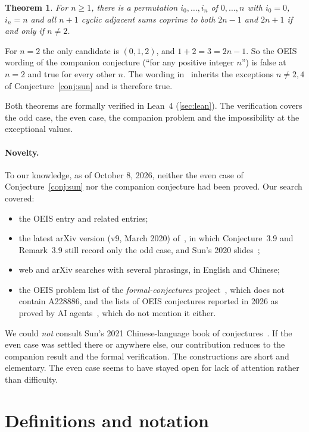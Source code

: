 \documentclass[11pt]{article}
\numberwithin{equation}{section}
\newtheorem{theorem}{Theorem}[section]
\theoremstyle{definition}
\theoremstyle{remark}
\begin{document}
\begin{theorem}\label{thm:companion}
For $n\ge1$, there is a permutation $i_0,\dots,i_n$ of $0,\dots,n$ with $i_0=0$, $i_n=n$ and all
$n+1$ cyclic adjacent sums coprime to both $2n-1$ and $2n+1$ if and only if $n\neq2$.
\end{theorem}

For $n=2$ the only candidate is $(0,1,2)$, and $1+2=3=2n-1$. So the OEIS wording of the companion
conjecture (``for any positive integer $n$'') is false at $n=2$ and true for every other $n$. The
wording in~\cite{Sun1309} inherits the exceptions $n\ne2,4$ of Conjecture~\ref{conj:sun} and is
therefore true.

Both theorems are formally verified in Lean~4 (\cref{sec:lean}). The verification covers the odd
case, the even case, the companion problem and the impossibility at the exceptional values.

\paragraph{Novelty.}
To our knowledge, as of October 8, 2026, neither the even case of Conjecture~\ref{conj:sun} nor the
companion conjecture had been proved. Our search covered:
\begin{itemize}
  \item the OEIS entry and related entries;
  \item the latest arXiv version (v9, March 2020) of~\cite{Sun1309}, in which Conjecture~3.9 and
  Remark~3.9 still record only the odd case, and Sun's 2020 slides~\cite{SunTalk2020};
  \item web and arXiv searches with several phrasings, in English and Chinese;
  \item the OEIS problem list of the \emph{formal-conjectures} project~\cite{FormalConj}, which
  does not contain A228886, and the lists of OEIS conjectures reported in 2026 as proved by AI
  agents~\cite{AI2605,AI2608}, which do not mention it either.
\end{itemize}
We could \emph{not} consult Sun's 2021 Chinese-language book of conjectures~\cite{SunBook}. If the
even case was settled there or anywhere else, our contribution reduces to the companion result and
the formal verification. The constructions are short and elementary. The even case seems to have
stayed open for lack of attention rather than difficulty.

\section{Definitions and notation}\label{sec:defs}
\end{document}
